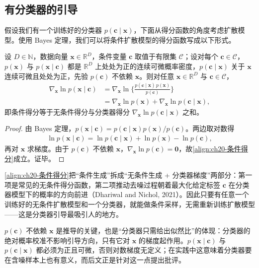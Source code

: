 \documentclass[../../main.tex]{subfiles}
\begin{document}
\subsection{有分类器的引导}\label{subsection:ch20-有分类器的引导}

假设我们有一个训练好的分类器 $p(\bm{c}\mid\bm{x})$，下面从得分函数的角度考虑扩散模型。使用 Bayes 定理，我们可以将条件扩散模型的得分函数写成以下形式。

\begin{proposition}[分类器引导的得分分解]\label{proposition:ch20-分类器引导}
设 $D\in\mathbb{N}$，数据向量 $\bm{x}\in\mathbb{R}^{D}$，条件变量 $\bm{c}$ 取值于有限集 $\mathcal{C}$；设对每个 $\bm{c}\in\mathcal{C}$，$p(\bm{x})$ 与 $p(\bm{x}\mid\bm{c})$ 都是 $\mathbb{R}^{D}$ 上处处为正的连续可微概率密度，$p(\bm{c}\mid\bm{x})$ 关于 $\bm{x}$ 连续可微且处处为正，先验 $p(\bm{c})$ 不依赖 $\bm{x}$。则对任意 $\bm{x}\in\mathbb{R}^{D}$ 与 $\bm{c}\in\mathcal{C}$，
\begin{align}
\nabla_{\bm{x}}\ln p(\bm{x}\mid\bm{c})&=\nabla_{\bm{x}}\ln\Big\{\frac{p(\bm{c}\mid\bm{x})\,p(\bm{x})}{p(\bm{c})}\Big\}\nonumber\\
&=\nabla_{\bm{x}}\ln p(\bm{x})+\nabla_{\bm{x}}\ln p(\bm{c}\mid\bm{x}),
\label{align:ch20-条件得分}
\end{align}
即条件得分等于无条件得分与分类器得分 $\nabla_{\bm{x}}\ln p(\bm{c}\mid\bm{x})$ 之和。
\end{proposition}

\begin{proof}
由 Bayes 定理，$p(\bm{x}\mid\bm{c})=p(\bm{c}\mid\bm{x})p(\bm{x})/p(\bm{c})$。两边取对数得
\begin{align*}
\ln p(\bm{x}\mid\bm{c})=\ln p(\bm{c}\mid\bm{x})+\ln p(\bm{x})-\ln p(\bm{c}),
\end{align*}
再对 $\bm{x}$ 求梯度。由于 $p(\bm{c})$ 不依赖 $\bm{x}$，$\nabla_{\bm{x}}\ln p(\bm{c})=\bm{0}$，故\eqref{align:ch20-条件得分}成立。证毕。
\end{proof}

\begin{remark}
\eqref{align:ch20-条件得分}把“条件生成”拆成“无条件生成 + 分类器梯度”两部分：第一项是常见的无条件得分函数，第二项推动去噪过程朝着最大化给定标签 $\bm{c}$ 在分类器模型下的概率的方向前进（Dhariwal and Nichol, 2021）。因此只要有任意一个训练好的无条件扩散模型和一个分类器，就能做条件采样，无需重新训练扩散模型——这是分类器引导最吸引人的地方。\par
$p(\bm{c})$ 不依赖 $\bm{x}$ 是推导的关键，也是“分类器只需给出似然比”的体现：分类器的绝对概率校准不影响引导方向，只有它对 $\bm{x}$ 的梯度起作用。$p(\bm{x}\mid\bm{c})$ 与 $p(\bm{c}\mid\bm{x})$ 都必须为正且可微，否则对数梯度无定义；在实践中这意味着分类器要在含噪样本上也有意义，而后文正是针对这一点提出批评。\par
\end{remark}
\end{document}
